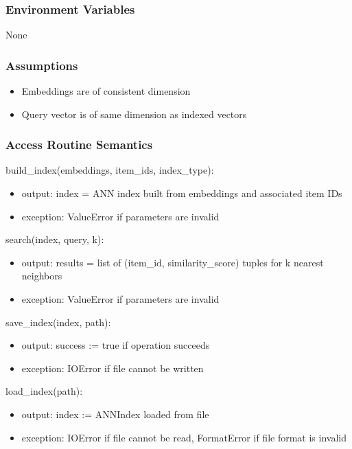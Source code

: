 \documentclass[12pt, titlepage]{article}
\begin{document}
\subsubsection{Environment Variables}

None

\subsubsection{Assumptions}

\begin{itemize}
  \item Embeddings are of consistent dimension
  \item Query vector is of same dimension as indexed vectors
\end{itemize}

\subsubsection{Access Routine Semantics}

\noindent build\_index(embeddings, item\_ids, index\_type):
\begin{itemize}
\item output: index = ANN index built from embeddings and associated item IDs
\item exception: ValueError if parameters are invalid
\end{itemize}

\noindent search(index, query, k):
\begin{itemize}
\item output: results = list of (item\_id, similarity\_score) tuples for k nearest neighbors
\item exception: ValueError if parameters are invalid
\end{itemize}

\noindent save\_index(index, path):
\begin{itemize}
\item output: success := true if operation succeeds
\item exception: IOError if file cannot be written
\end{itemize}

\noindent load\_index(path):
\begin{itemize}
  \item output: index := ANNIndex loaded from file
  \item exception: IOError if file cannot be read, FormatError if file format is invalid
\end{itemize}
\end{document}
